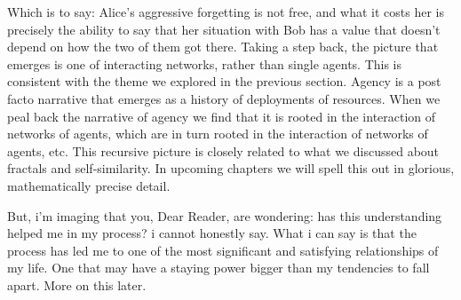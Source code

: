 Which is to say: Alice's aggressive forgetting is not free, and what it costs her is precisely the ability to say that her situation with Bob has a value that doesn't depend on how the two of them got there. Taking a step back, the picture that emerges is one of interacting networks, rather than single agents. This is consistent with the theme we explored in the previous section. Agency is a post facto narrative that emerges as a history of deployments of resources. When we peal back the narrative of agency we find that it is rooted in the interaction of networks of agents, which are in turn rooted in the interaction of networks of agents, etc. This recursive picture is closely related to what we discussed about fractals and self-similarity. In upcoming chapters we will spell this out in glorious, mathematically precise detail.

But, i'm imaging that you, Dear Reader, are wondering: has this understanding helped me in my process? i cannot honestly say. What i can say is that the process has led me to one of the most significant and satisfying relationships of my life. One that may have a staying power bigger than my tendencies to fall apart. More on this later.
